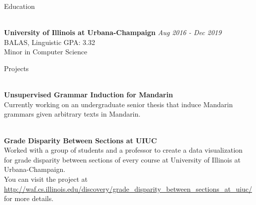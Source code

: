 \documentclass{resume}
\begin{document}
\begin{rSection}{Education}

\\{\bf University of Illinois at Urbana-Champaign} \hfill {\em Aug 2016 - Dec 2019} 
\\ BALAS, Linguistic\hfill { GPA: 3.32 } \\
Minor in Computer Science \smallskip \\

\end{rSection}

\begin{rSection}{Projects}

\\{\bf Unsupervised Grammar Induction for Mandarin}\\
Currently working on an undergraduate senior thesis that induce Mandarin grammars given arbitrary texts in Mandarin.

\\{\bf Grade Disparity Between Sections at UIUC}\\
Worked with a group of students and a professor to create a data visualization for grade disparity between sections of every course at University of Illinois at Urbana-Champaign.\\
You can visit the project at \url{http://waf.cs.illinois.edu/discovery/grade_disparity_between_sections_at_uiuc/} for more details.

\end{rSection}
\end{document}

